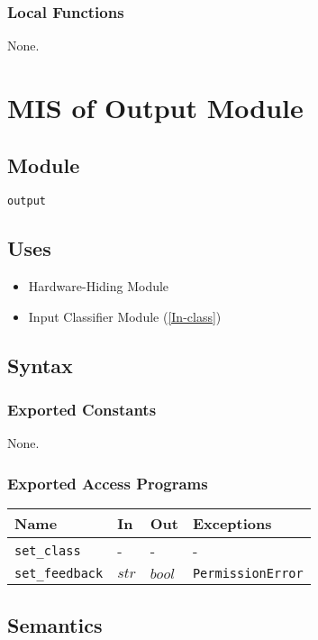 \documentclass[12pt, titlepage]{article}
\def\code#1{\texttt{#1}}
\begin{document}
\subsubsection{Local Functions}
None.

\newpage

\section{MIS of Output Module} \label{Output} 

\subsection{Module}
\code{output} 

\subsection{Uses}
\begin{itemize}
  \item Hardware-Hiding Module  
  \item Input Classifier Module (\ref{In-class})
\end{itemize}


\subsection{Syntax}

\subsubsection{Exported Constants}
None.

\subsubsection{Exported Access Programs}

\begin{center}
\begin{tabular}{p{2.5cm} p{4cm} p{4cm} p{3cm}}
\hline
\textbf{Name} & \textbf{In} & \textbf{Out} & \textbf{Exceptions} \\
\hline
\code{set\_class} & - & - & - \\
\code{set\_feedback} & $str$ & $bool$ &  \code{PermissionError}\\
\hline
\end{tabular}
\end{center}

\subsection{Semantics}
\end{document}
